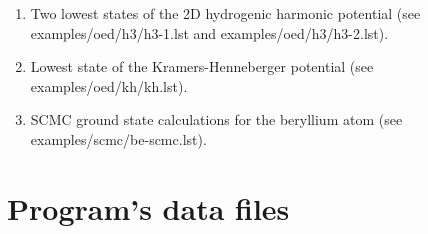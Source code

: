 \documentclass[12pt,a4paper]{article}
\begin{document}
\begin{enumerate}


\newpage

\item Two lowest states of the 2D hydrogenic harmonic potential (see
  examples/\-oed/\-h3/\-h3-1.lst and examples/\-oed/\-h3/\-h3-2.lst).






\newpage

\item Lowest state of the Kramers-Henneberger potential (see
  examples/\-oed/\-kh/\-kh.lst).



\item SCMC ground state calculations for the beryllium atom (see
  examples/\-scmc/\-be-scmc.lst).



\end{enumerate}

\newpage

\section{Program's data files}
\end{document}
